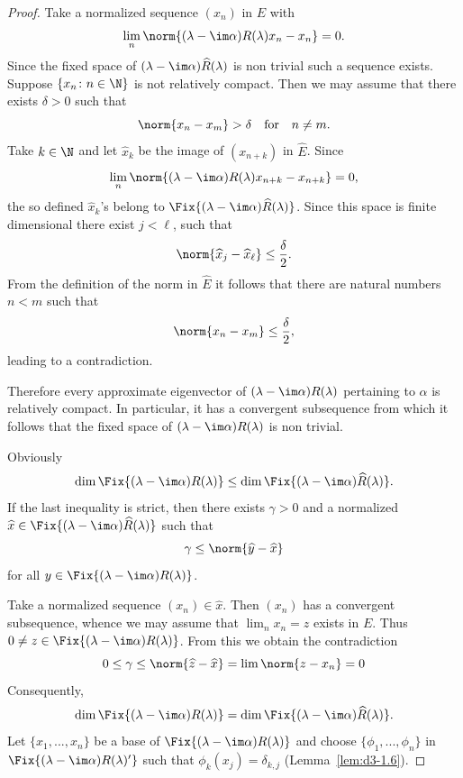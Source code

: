 \begin{proof}
Take a normalized sequence $(x_{n})$ in $E$ with
\[
\lim_{n}\norm{(\lambda - \im\alpha)R(\lambda)x_{n} - x_{n}} = 0 .
\]
Since the fixed space of {$(\lambda-\im\alpha)\widehat{R}(\lambda)$} is non trivial such a sequence exists.
Suppose $\{ x_{n} \colon n\in\N \}$ is not relatively compact.
Then we may assume that there exists $\delta > 0$ such that
\[
	\norm{x_{n} - x_{m}} > \delta \quad \text{for} \quad n \neq m .
\]
Take $k \in \N $ and let $\widehat{x}_{k}$ be the image of\/ $(x_{n+k})$ in $\widehat{E}$.
Since
\[
	\lim_{n}\norm{(\lambda - \im\alpha)R(\lambda)x_{n+k} - x_{n+k}} = 0 ,
\]
the so defined $\widehat{x}_{k}$'s belong to $\Fix{(\lambda - \im\alpha)\widehat{R}(\lambda)}$.
Since this space is finite dimensional there exist $j < \ell$,  such that
\[
	\norm{\widehat{x}_{j} - \widehat{x}_{\ell}} \leq \frac{\delta}{2} .
\]
From the definition of the norm in $\widehat{E}$ it follows that there are natural numbers $n < m$ such that
\[
\norm{x_{n} - x_{m}} \leq \frac{\delta}{2} ,
\]
leading to a contradiction.

Therefore every approximate eigenvector of\/ $(\lambda - \im\alpha)R(\lambda)$ pertaining to $\alpha$ is relatively compact.
In particular, it has a convergent subsequence from which it follows that the fixed space of\/ $(\lambda - \im\alpha)R(\lambda)$ is non trivial.

Obviously
\[
\dim \Fix{(\lambda - \im\alpha)R(\lambda)} \leq \dim \Fix{(\lambda - \im\alpha)\widehat{R}(\lambda)} .
\]
If the last inequality is strict, then there exists $\gamma > 0$ and a normalized 
$\widehat{x} \in \Fix  {(\lambda - \im\alpha)\widehat{R}(\lambda)}$ such that
\[
\gamma \leq \norm{\widehat{y} - \widehat{x}}
\]
for all $y \in \Fix  {(\lambda - \im\alpha)R(\lambda)}$.

Take a normalized sequence $(x_{n}) \in \widehat{x}$.
Then $(x_{n})$ has a convergent subsequence, whence we may assume that $\lim_{n} x_{n} = z$ exists in $E$.
Thus $0 \neq z \in \Fix{(\lambda - \im\alpha)R(\lambda)}$.
From this we obtain the contradiction
\[
 0 \leq \gamma \leq \norm{\widehat{z} - \widehat{x}} = \lim \norm{z - x_{n}} = 0
\]
Consequently,
\[
\dim \Fix{(\lambda - \im\alpha)R(\lambda)} = \dim \Fix{(\lambda - \im\alpha)\widehat{R}(\lambda)}.
\]
Let $\{x_{1},...,x_{n}\}$ be a base of 
$\Fix{(\lambda - \im\alpha)R(\lambda)}$ and choose $\{\phi_{1},...,\phi_{n}\}$ in 
$\Fix{(\lambda - \im\alpha)R(\lambda)'}$ such that $\phi_{k}(x_{j}) = \delta_{k,j}$ 
(Lemma~\ref{lem:d3-1.6}).


\end{proof}
